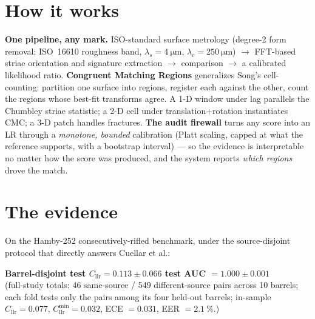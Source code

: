 \documentclass[10pt]{article}
\newcommand{\Cllr}{C_{\mathrm{llr}}}
\begin{document}
\section{How it works}
\textbf{One pipeline, any mark.} ISO-standard surface metrology (degree-2 form
removal; ISO~16610 roughness band, $\lambda_s=\SI{4}{\micro\meter}$,
$\lambda_c=\SI{250}{\micro\meter}$) $\rightarrow$ FFT-based striae orientation and
signature extraction $\rightarrow$ comparison $\rightarrow$ a calibrated likelihood
ratio. \textbf{Congruent Matching Regions} generalizes Song's cell-counting:
partition one surface into regions, register each against the other, count the
regions whose best-fit transforms agree. A 1-D window under lag parallels the
Chumbley striae statistic; a 2-D cell under translation+rotation instantiates CMC; a
3-D patch handles fractures. \textbf{The audit firewall} turns any score into an LR
through a \emph{monotone, bounded} calibration (Platt scaling, capped at what the
reference supports, with a bootstrap interval) --- so the evidence is
interpretable no matter how the score was produced, and the system reports
\emph{which regions} drove the match.

\section{The evidence}
On the Hamby-252 consecutively-rifled benchmark, under the source-disjoint protocol
that directly answers Cuellar et al.:

\begin{claimbox}
\centering
\textbf{Barrel-disjoint test $\Cllr = \num{0.113}\pm\num{0.066}$ \quad\textbar\quad
test AUC $= \num{1.000}\pm\num{0.001}$}\\[1pt]
{\small (full-study totals: 46 same-source / 549 different-source pairs across 10
barrels; each fold tests only the pairs among its four held-out barrels; in-sample
$\Cllr = \num{0.077}$, $\Cllr^{\min}=\num{0.032}$, ECE $=\num{0.031}$,
EER $=\SI{2.1}{\percent}$.)}
\end{claimbox}
\end{document}

